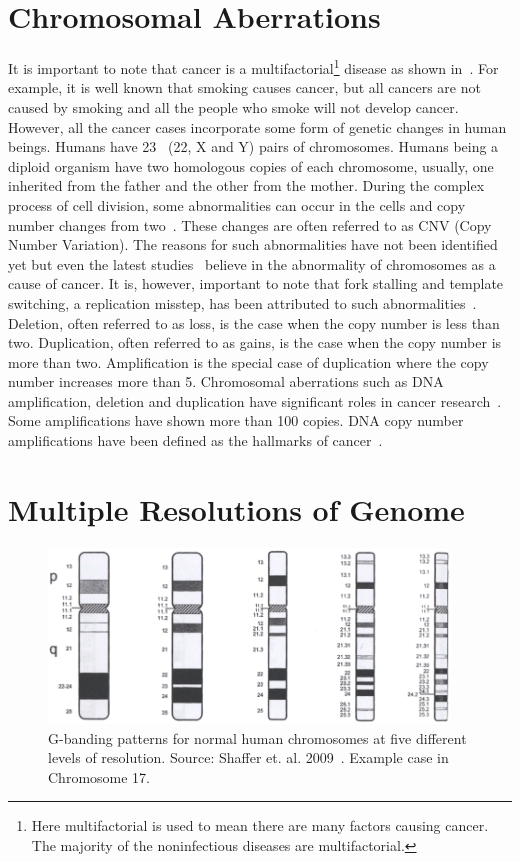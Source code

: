 \section{Chromosomal Aberrations}
\label{s:chrabr}
It is important to note that cancer is a multifactorial\footnote{Here multifactorial is used to mean there are many factors causing cancer. The majority of the noninfectious diseases are multifactorial.} disease as shown in~\cite{Myllykangas200815}. For example, it is well known that smoking causes cancer, but all cancers are not caused by smoking and all the people who smoke will not develop cancer. However, all the cancer cases incorporate some form of genetic changes in human beings. Humans have 23 ~(22, X and Y) pairs of chromosomes. Humans being a diploid organism have two homologous copies of each chromosome, usually, one inherited from the father and the other from the mother. During the complex process of cell division, some abnormalities can occur in the cells and copy number changes from two~\cite{aberrations}. These changes are often referred to as CNV (Copy Number Variation). The reasons for such abnormalities have not been identified yet but even the latest studies~\cite{lateststudies} believe in the abnormality of chromosomes as a cause of cancer. It is, however, important to note that fork stalling and template switching, a replication misstep, has been attributed to such abnormalities~\cite{abnormality}. Deletion, often referred to as loss, is the case when the copy number is less than two. Duplication, often referred to as gains, is the case when the copy number is more than two. Amplification is the special case of duplication where the copy number increases more than 5. Chromosomal aberrations such as DNA amplification, deletion and duplication have significant roles in cancer research~\cite{aberrations}. Some amplifications have shown more than 100 copies. DNA copy number amplifications have been defined as the hallmarks of cancer~\cite{Tikka2007972}. 

\section{Multiple Resolutions of Genome}
\label{s:multipleresolutions}

\begin{figure}[h!]
\centering
\includegraphics[width=0.95\textwidth]{figures/bands17.eps}
\caption[G-banding patterns in different resolution]{G-banding patterns for normal human chromosomes at five different levels of resolution. Source: Shaffer et. al. 2009~\cite{iscn}. Example case in Chromosome 17.} \label{Fig:probmultires}
\end{figure}

